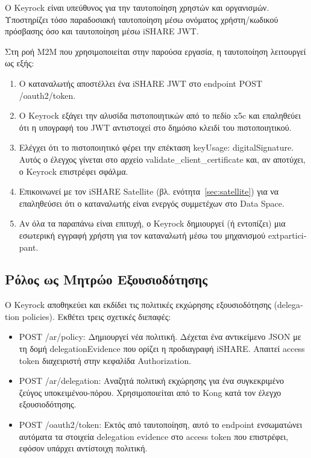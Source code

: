 Ο \textlatin{Keyrock} είναι υπεύθυνος για την ταυτοποίηση χρηστών
και οργανισμών. Υποστηρίζει τόσο παραδοσιακή ταυτοποίηση μέσω
ονόματος χρήστη/κωδικού πρόσβασης όσο
και ταυτοποίηση μέσω \textlatin{iSHARE JWT}.

Στη ροή \textlatin{M2M} που χρησιμοποιείται στην παρούσα εργασία, η
ταυτοποίηση λειτουργεί ως εξής:
\begin{enumerate}
    \item Ο καταναλωτής αποστέλλει ένα \textlatin{iSHARE JWT} στο
    \textlatin{endpoint} \textlatin{POST /oauth2/token}.
    \item Ο \textlatin{Keyrock} εξάγει την αλυσίδα πιστοποιητικών
    από το πεδίο \textlatin{x5c} και επαληθεύει ότι η υπογραφή του
    \textlatin{JWT} αντιστοιχεί στο δημόσιο κλειδί του πιστοποιητικού.
    \item Ελέγχει ότι το πιστοποιητικό φέρει την επέκταση
    \textlatin{keyUsage: digitalSignature}. Αυτός ο έλεγχος γίνεται
    στο αρχείο \textlatin{validate\_client\_certificate} και, αν
    αποτύχει, ο \textlatin{Keyrock} επιστρέφει σφάλμα.
    \item Επικοινωνεί με τον \textlatin{iSHARE Satellite} (βλ.
    ενότητα~\ref{sec:satellite}) για να επαληθεύσει ότι ο καταναλωτής
    είναι ενεργός συμμετέχων στο \textlatin{Data Space}.
    \item Αν όλα τα παραπάνω είναι επιτυχή, ο \textlatin{Keyrock}
    δημιουργεί (ή εντοπίζει) μια εσωτερική εγγραφή χρήστη για τον
    καταναλωτή μέσω του μηχανισμού \textlatin{extparticipant}.
\end{enumerate}

\subsection{Ρόλος ως Μητρώο Εξουσιοδότησης }
\label{subsec:keyrock-ar}

Ο \textlatin{Keyrock} αποθηκεύει και εκδίδει τις πολιτικές εκχώρησης
εξουσιοδότησης (\textlatin{delegation policies}). Εκθέτει τρεις σχετικές
διεπαφές:

\begin{itemize}
    \item \textlatin{POST /ar/policy}: Δημιουργεί νέα πολιτική. Δέχεται
    ένα αντικείμενο \textlatin{JSON} με τη δομή
    \textlatin{delegationEvidence} που ορίζει η προδιαγραφή
    \textlatin{iSHARE}. Απαιτεί \textlatin{access token} διαχειριστή
    στην κεφαλίδα \textlatin{Authorization}.
    \item \textlatin{POST /ar/delegation}: Αναζητά πολιτική εκχώρησης για
    ένα συγκεκριμένο ζεύγος υποκειμένου-πόρου. Χρησιμοποιείται από το
    \textlatin{Kong} κατά τον έλεγχο εξουσιοδότησης.
    \item \textlatin{POST /oauth2/token}: Εκτός από ταυτοποίηση, αυτό
    το \textlatin{endpoint} ενσωματώνει αυτόματα τα στοιχεία
    \textlatin{delegation evidence} στο \textlatin{access token} που
    επιστρέφει, εφόσον υπάρχει αντίστοιχη πολιτική.
\end{itemize}

